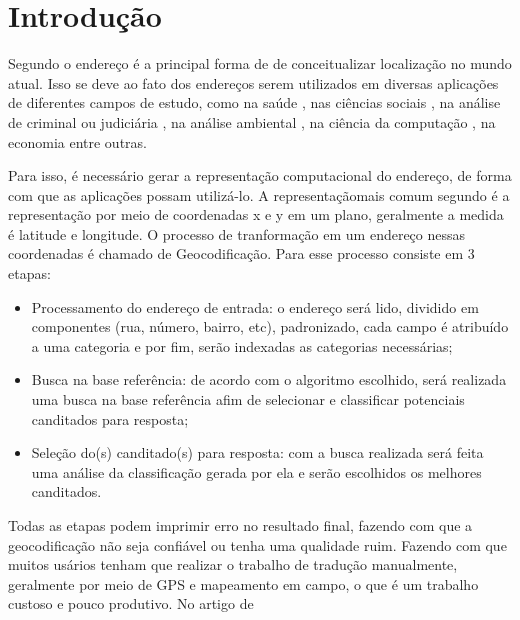 \chapter{Introdução} \label{Introducao}








Segundo o \cite{Zamberg2009} endereço é a principal forma de de conceitualizar localização no mundo atual. Isso se deve ao fato dos endereços serem utilizados em diversas aplicações de diferentes campos de estudo, como na saúde \cite{AmericaJournal2001,Kypri2009,Mazumdar2008}, nas ciências sociais \cite{Chow2011}, na análise de criminal ou judiciária \cite{Olligschlaeger1998}, na análise ambiental \cite{Gilboa2006}, na ciência da computação \cite{Zamberg2009}, na economia \cite{Whitsel2006} entre outras.

Para isso, é necessário gerar a representação computacional do endereço, de forma com que as aplicações possam utilizá-lo. A representaçãomais comum segundo \cite{Zamberg2009} é a representação por meio de coordenadas x e y em um plano, geralmente a medida é latitude e longitude. O processo de tranformação em um endereço nessas coordenadas é chamado de Geocodificação. Para \cite{Zamberg2009} esse processo consiste em 3 etapas:
\begin{itemize}
   \item Processamento do endereço de entrada: o endereço será lido, dividido em componentes (rua, número, bairro, etc), padronizado, cada campo é atribuído a uma categoria e por fim, serão indexadas as categorias necessárias; 
   \item Busca na base referência: de acordo com o algoritmo escolhido, será realizada uma busca na base referência afim de selecionar e classificar potenciais canditados para resposta;
   \item Seleção do(s) canditado(s) para resposta: com a busca realizada será feita uma análise da classificação gerada por ela e serão escolhidos os melhores canditados.
\end{itemize}
Todas as etapas podem imprimir erro no resultado final, fazendo com que a geocodificação não seja confiável ou tenha uma qualidade ruim. Fazendo com que muitos usários tenham que realizar o trabalho de tradução manualmente, geralmente por meio de GPS e mapeamento em campo, o que é um trabalho custoso e pouco produtivo. No artigo de \cite{Zamberg2009} 

